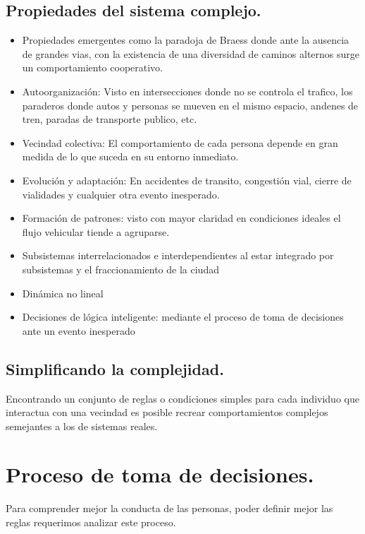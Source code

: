 \documentclass[10pt]{article}
\begin{document}
\subsection{Propiedades del sistema complejo.}
\begin{itemize}
\item Propiedades emergentes como la paradoja de Braess donde ante la ausencia de grandes vias, con la existencia de una diversidad de caminos alternos surge un comportamiento cooperativo. 
\item Autoorganización: Visto en intersecciones donde no se controla el trafico, los paraderos donde autos y personas se mueven en el mismo espacio, andenes de tren, paradas de transporte publico, etc. 
\item Vecindad colectiva: El comportamiento de cada persona depende en gran medida de lo que suceda en su entorno inmediato.
\item Evolución y adaptación: En accidentes de transito, congestión vial, cierre de vialidades y cualquier otra evento inesperado.
\item Formación de patrones: visto con mayor claridad en condiciones ideales el flujo vehicular tiende a agruparse.
\item Subsistemas interrelacionados e interdependientes al estar integrado por subsistemas y el fraccionamiento de la ciudad 
\item Dinámica no lineal
\item Decisiones de lógica inteligente: mediante el proceso de toma de decisiones ante un evento inesperado \\

\end{itemize}
\subsection{Simplificando la complejidad.}

Encontrando un conjunto de reglas o condiciones simples para cada individuo que interactua con una vecindad es posible recrear comportamientos complejos semejantes a los de sistemas reales. 

\newpage
\section{Proceso de toma de decisiones.}
Para comprender mejor la conducta de las personas, poder definir mejor las reglas requerimos analizar este proceso. \\
\end{document}
